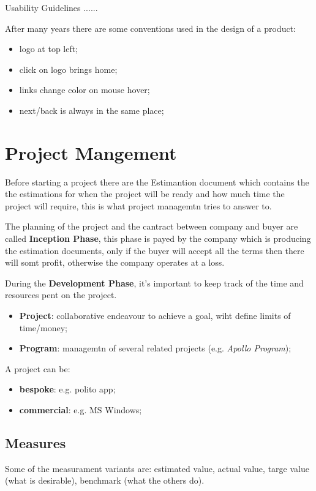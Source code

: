 \documentclass[12pt]{article}
\begin{document}
Usability Guidelines ......

After many years there are some conventions used in the design of a product: 
\begin{itemize}
  \item logo at top left;
  \item click on logo brings home;
  \item links change color on mouse hover;
  \item next/back is always in the same place;
\end{itemize}



\newpage
\section{Project Mangement}
Before starting a project there are the Estimantion document which contains the the estimations for when the project will be ready and how much time the project will require, this is what project managemtn tries to answer to.

The planning of the project and the cantract between company and buyer are called \textbf{Inception Phase}, this phase is payed by the company which is producing the estimation documents, only if the buyer will accept all the terms then there will somt profit, otherwise the company operates at a loss.

During the \textbf{Development Phase}, it's important to keep track of the time and resources pent on the project.

\begin{itemize}
  \item \textbf{Project}: collaborative endeavour to achieve  a goal, wiht define limits of time/money;
  \item \textbf{Program}: managemtn of several related projects (e.g. \emph{Apollo Program});
\end{itemize}
A project can be:
\begin{itemize}
  \item \textbf{bespoke}: e.g. polito app;
  \item \textbf{commercial}: e.g. MS Windows;
\end{itemize}

\subsection{Measures}
Some of the measurament variants are: estimated value, actual value, targe value (what is desirable), benchmark (what the others do).
\end{document}
